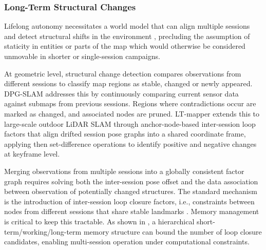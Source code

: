 \subsubsection{Long-Term Structural Changes} \label{sec:dynamics_representations_longterm}
Lifelong autonomy necessitates a world model that can align multiple sessions and detect structural shifts in the environment \cite{deeb_model-based_2019} \cite{catalano_3d_2025}, precluding the assumption of staticity in entities or parts of the map which would otherwise be considered unmovable in shorter or single-session campaigns.

At geometric level, structural change detection compares observations from different sessions to classify map regions as stable, changed or newly appeared. 
DPG-SLAM \cite{walcott-bryant_dynamic_2012} addresses this by continuously comparing current sensor data against submaps from previous sessions.
Regions where contradictions occur are marked as changed, and associated nodes are pruned.
LT-mapper \cite{kim2022lt} extends this to large-scale outdoor LiDAR SLAM through anchor-node-based inter-session loop factors that align drifted session pose graphs into a shared coordinate frame, applying then set-difference operations to identify positive and negative changes at keyframe level.

Merging observations from multiple sessions into a globally consistent factor graph requires solving both the inter-session pose offset and the data association between observation of potentially changed structures.
The standard mechanism is the introduction of inter-session loop closure factors, i.e.,  constraints between nodes from different sessions that share stable landmarks \cite{kim2022lt}.
Memory management is critical to keep this tractable. As shown in \cite{labbe2014online}, a hierarchical short-term/working/long-term memory structure can bound the number of loop closure candidates, enabling multi-session operation under computational constraints. 

